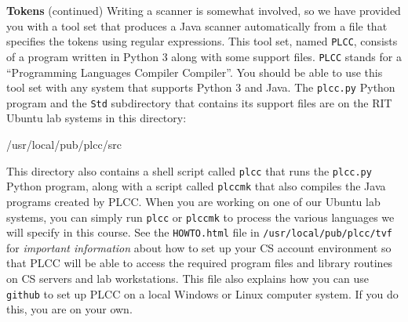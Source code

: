 \begin{minipage}[t]{\sw}
\slidenumber
\LARGE
{\bf Tokens} (continued)\exx
Writing a scanner is somewhat involved,
so we have provided you with a tool set
that produces a Java scanner automatically
from a file that specifies the tokens using regular expressions.
This tool set, named \verb'PLCC',
consists of a program written in Python 3
along with some support files.
\verb'PLCC' stands for a ``Programming Languages Compiler Compiler''.
You should be able to use this tool set with any system
that supports Python 3 and Java.
The \verb'plcc.py' Python program
and the \verb'Std' subdirectory that contains its support files
are on the RIT Ubuntu lab systems in this directory:
\begin{qv}
/usr/local/pub/plcc/src
\end{qv}
This directory also contains a shell script called \verb'plcc'
that runs the \verb'plcc.py' Python program,
along with a script called \verb'plccmk'
that also compiles the Java programs created by PLCC.
When you are working on one of our Ubuntu lab systems,
you can simply run \verb'plcc' or \verb'plccmk'
to process the various languages we will specify in this course.\exx
See the \verb'HOWTO.html' file in \verb'/usr/local/pub/plcc/tvf'
for {\em important information} about how
to set up your CS account environment
so that PLCC will be able to access the required program files
and library routines on CS servers and lab workstations.
This file also explains how you can use \verb'github'
to set up PLCC on a local Windows or Linux computer system.
If you do this, you are on your own.
\end{minipage}
\clearpage

